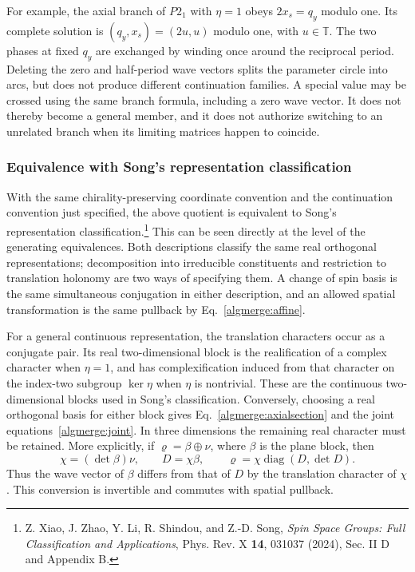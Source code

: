 For example, the axial branch of $P2_1$ with $\eta=1$ obeys
$2x_s=q_y$ modulo one. Its complete solution is
$(q_y,x_s)=(2u,u)$ modulo one, with $u\in\mathbb T$.
The two phases at fixed $q_y$ are exchanged by winding once
around the reciprocal period. Deleting the zero and half-period
wave vectors splits the parameter circle into arcs, but does
not produce different continuation families. A special value
may be crossed using the same branch formula, including a
zero wave vector. It does not thereby become a general member,
and it does not authorize switching to an unrelated branch
when its limiting matrices happen to coincide.

\subsubsection{Equivalence with Song's representation classification}

With the same chirality-preserving coordinate convention and
the continuation convention just specified, the above quotient
is equivalent to Song's representation classification.\footnote{%
Z. Xiao, J. Zhao, Y. Li, R. Shindou, and Z.-D. Song,
\textit{Spin Space Groups: Full Classification and Applications},
Phys. Rev. X \textbf{14}, 031037 (2024), Sec. II D and Appendix B.}
This can be seen directly at the level of the generating
equivalences. Both descriptions classify the same real
orthogonal representations; decomposition into irreducible
constituents and restriction to translation holonomy are two
ways of specifying them. A change of spin basis is the same
simultaneous conjugation in either description, and an allowed
spatial transformation is the same pullback by
Eq.~\eqref{algmerge:affine}.

For a general continuous representation, the translation
characters occur as a conjugate pair. Its real two-dimensional
block is the realification of a complex character when
$\eta=1$, and has complexification induced from that character
on the index-two subgroup $\ker\eta$ when $\eta$ is nontrivial.
These are the continuous two-dimensional blocks used in Song's
classification. Conversely, choosing a real orthogonal basis
for either block gives Eq.~\eqref{algmerge:axialsection} and
the joint equations~\eqref{algmerge:joint}. In three dimensions
the remaining real character must be retained. More explicitly,
if $\varrho=\beta\oplus\nu$, where $\beta$ is the plane block,
then
\begin{equation}
 \chi=(\det\beta)\nu,\qquad D=\chi\beta,\qquad
 \varrho=\chi\operatorname{diag}(D,\det D).
 \tag{38g}\label{algmerge:dictionary}
\end{equation}
Thus the wave vector of $\beta$ differs from that of $D$ by
the translation character of $\chi$. This conversion is
invertible and commutes with spatial pullback.

